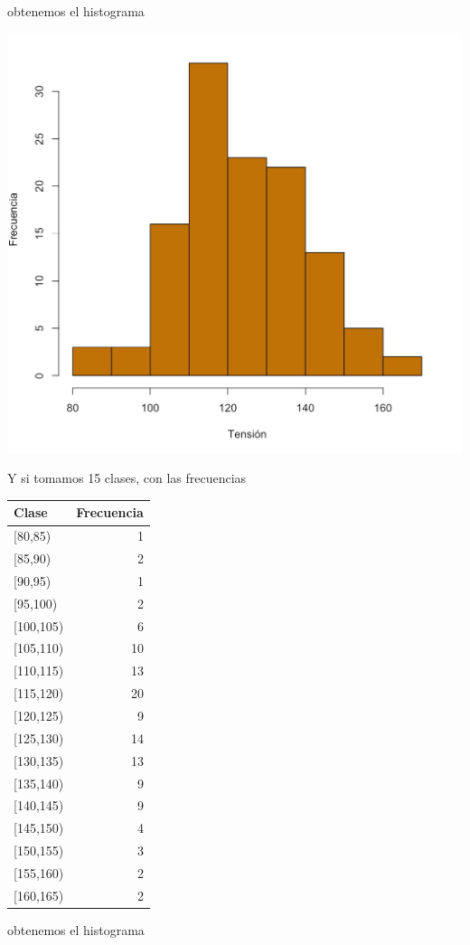 \documentclass[
]{book}
\theoremstyle{definition}
\theoremstyle{definition}
\theoremstyle{definition}
\theoremstyle{definition}
\theoremstyle{remark}
\begin{document}
obtenemos el histograma

\begin{center}\includegraphics[width=0.6\linewidth]{INREMDN_files/figure-html/tensio3} \end{center}

Y si tomamos 15 clases, con las frecuencias

\begin{table}
\centering
\begin{tabular}{l|r}
\hline
Clase & Frecuencia\\
\hline
[80,85) & 1\\
\hline
[85,90) & 2\\
\hline
[90,95) & 1\\
\hline
[95,100) & 2\\
\hline
[100,105) & 6\\
\hline
[105,110) & 10\\
\hline
[110,115) & 13\\
\hline
[115,120) & 20\\
\hline
[120,125) & 9\\
\hline
[125,130) & 14\\
\hline
[130,135) & 13\\
\hline
[135,140) & 9\\
\hline
[140,145) & 9\\
\hline
[145,150) & 4\\
\hline
[150,155) & 3\\
\hline
[155,160) & 2\\
\hline
[160,165) & 2\\
\hline
\end{tabular}
\end{table}

obtenemos el histograma
\end{document}
